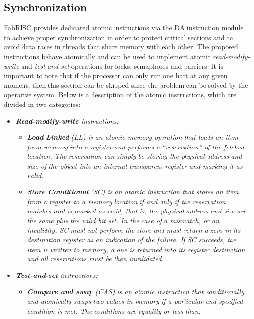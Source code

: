     \subsection{Synchronization}

        \vspace{10pt}

        FabRISC provides dedicated atomic instructions via the DA instruction module to achieve proper synchronization in order to protect critical sections and to avoid data races in threads that share memory with each other. The proposed instructions behave atomically and can be used to implement atomic \textit{read-modify-write} and \textit{test-and-set} operations for locks, semaphores and barriers. It is important to note that if the processor can only run one hart at any given moment, then this section can be skipped since the problem can be solved by the operative system. Below is a description of the atomic instructions, which are divided in two categories:

        \begin{itemize}

            \item \textit{\textbf{Read-modify-write} instructions:}

            \begin{itemize}

                \item \textit{\textbf{Load Linked} (LL) is an atomic memory operation that loads an item from memory into a register and performs a ``reservation'' of the fetched location. The reservation can simply be storing the physical address and size of the object into an internal transparent register and marking it as valid.}

                \item \textit{\textbf{Store Conditional} (SC) is an atomic instruction that stores an item from a register to a memory location if and only if the reservation matches and is marked as valid, that is, the physical address and size are the same plus the valid bit set. In the case of a mismatch, or an invalidity, SC must not perform the store and must return a zero in its destination register as an indication of the failure. If SC succeeds, the item is written to memory, a one is returned into its register destination and all reservations must be then invalidated.}

            \end{itemize}

            \item \textit{\textbf{Test-and-set} instructions:}

            \begin{itemize}

                \item \textit{\textbf{Compare and swap} (CAS) is an atomic instruction that conditionally and atomically swaps two values in memory if a particular and specified condition is met. The conditions are equality or less than.}

            \end{itemize}

        \end{itemize}


